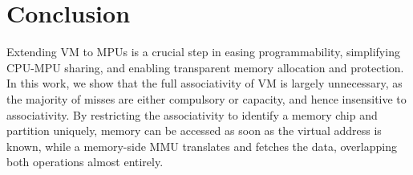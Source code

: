 \section{Conclusion}
\label{sec:conclusion}

Extending VM to MPUs is a crucial step in easing programmability, simplifying CPU-MPU sharing, and enabling transparent memory allocation and protection. In this work, we show that the full associativity of VM is largely unnecessary, as the majority of misses are either compulsory or capacity, and hence insensitive to associativity. By restricting the associativity to identify a memory chip and partition uniquely, memory can be accessed as soon as the virtual address is known, while a memory-side MMU translates and fetches the data, overlapping both operations almost entirely.




